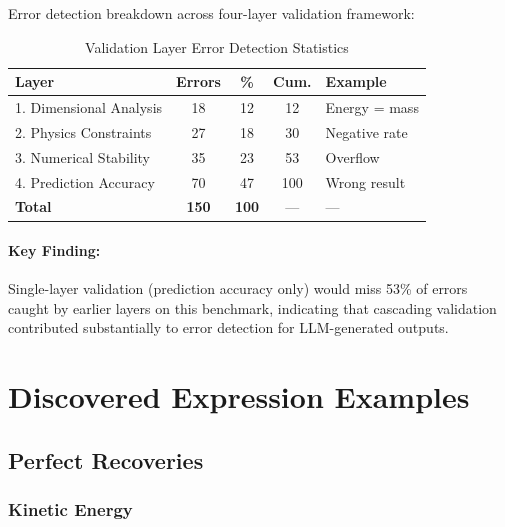 \documentclass[twoside,11pt]{article}
\begin{document}
Error detection breakdown across four-layer validation framework:

\begin{table}[H]
\centering
\caption{Validation Layer Error Detection Statistics}
\label{tab:validation_stats}
\begin{tabular}{@{}lcccp{3cm}@{}}
\toprule
\textbf{Layer} & \textbf{Errors} & \textbf{\%} & \textbf{Cum.} & \textbf{Example} \\
\midrule
1. Dimensional Analysis & 18 & 12 & 12 & Energy = mass \\
2. Physics Constraints & 27 & 18 & 30 & Negative rate \\
3. Numerical Stability & 35 & 23 & 53 & Overflow \\
4. Prediction Accuracy & 70 & 47 & 100 & Wrong result \\
\midrule
\textbf{Total} & \textbf{150} & \textbf{100} & --- & --- \\
\bottomrule
\end{tabular}
\end{table}

\paragraph{Key Finding:} Single-layer validation (prediction accuracy only) would miss 53\% of errors caught by earlier layers on this benchmark, indicating that cascading validation contributed substantially to error detection for LLM-generated outputs.

\clearpage


\section{Discovered Expression Examples}
\label{app:expressions}

\subsection{Perfect Recoveries}

\subsubsection{Kinetic Energy}
\end{document}
